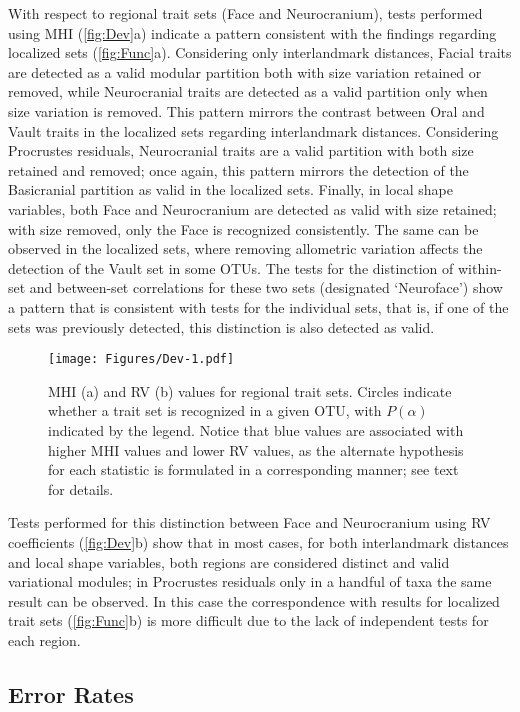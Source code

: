 \documentclass[12pt,]{article}
\begin{document}
With respect to regional trait sets (Face and Neurocranium), tests
performed using MHI (\autoref{fig:Dev}a) indicate a pattern consistent
with the findings regarding localized sets (\autoref{fig:Func}a).
Considering only interlandmark distances, Facial traits are detected as
a valid modular partition both with size variation retained or removed,
while Neurocranial traits are detected as a valid partition only when
size variation is removed. This pattern mirrors the contrast between
Oral and Vault traits in the localized sets regarding interlandmark
distances. Considering Procrustes residuals, Neurocranial traits are a
valid partition with both size retained and removed; once again, this
pattern mirrors the detection of the Basicranial partition as valid in
the localized sets. Finally, in local shape variables, both Face and
Neurocranium are detected as valid with size retained; with size
removed, only the Face is recognized consistently. The same can be
observed in the localized sets, where removing allometric variation
affects the detection of the Vault set in some OTUs. The tests for the
distinction of within-set and between-set correlations for these two
sets (designated `Neuroface') show a pattern that is consistent with
tests for the individual sets, that is, if one of the sets was
previously detected, this distinction is also detected as valid.

\begin{figure}[htbp]
\centering
\texttt{[image: Figures/Dev-1.pdf]}
\caption{MHI (a) and RV (b) values for regional trait sets. Circles
indicate whether a trait set is recognized in a given OTU, with
$P(\alpha)$ indicated by the legend. Notice that blue values are
associated with higher MHI values and lower RV values, as the alternate
hypothesis for each statistic is formulated in a corresponding manner;
see text for details. \label{fig:Dev}}
\end{figure}

Tests performed for this distinction between Face and Neurocranium using
RV coefficients (\autoref{fig:Dev}b) show that in most cases, for both
interlandmark distances and local shape variables, both regions are
considered distinct and valid variational modules; in Procrustes
residuals only in a handful of taxa the same result can be observed. In
this case the correspondence with results for localized trait sets
(\autoref{fig:Func}b) is more difficult due to the lack of independent
tests for each region.

\subsection{Error Rates}\label{error-rates}
\end{document}

